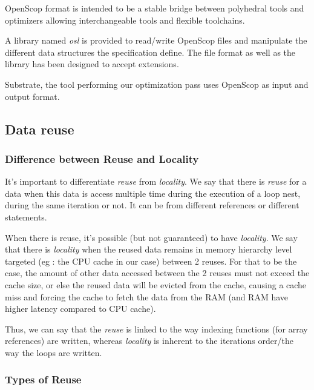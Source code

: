 \documentclass[paper=a4, fontsize=11pt]{scrartcl}
\numberwithin{equation}{section}        %
\numberwithin{figure}{section}          %
\numberwithin{table}{section}               %
\begin{document}
                OpenScop format is intended to be a stable bridge between polyhedral tools
                and optimizers allowing interchangeable tools and flexible toolchains.

                A library named \textit{osl} is provided to read/write OpenScop files
                and manipulate the different data structures the specification define.
                The file format as well as the library has been designed to accept extensions.

                Substrate, the tool performing our optimization pass uses OpenScop as input and output
                format.
    \subsection{Data reuse}
        \subsubsection{Difference between Reuse and Locality}
            It's important to differentiate \textit{reuse} from \textit{locality}.
            We say that there is \textit{reuse} for a data when this data is
            access multiple time during the execution of a loop nest, during
            the same iteration or not. It can be from different references or different statements.
            
            When there is reuse, it's possible (but not guaranteed) to have
            \textit{locality}. We say that there is \textit{locality} when the
            reused data remains in memory hierarchy level targeted 
            (eg : the CPU cache in our case) between 2 reuses.
            For that to be the case, the amount of other data accessed between the
            2 reuses must not exceed the cache size, or else the reused data will be
            evicted from the cache, causing a cache miss and forcing the cache
            to fetch the data from the RAM (and RAM have higher latency compared to CPU cache).


            Thus, we can say that the \textit{reuse} is linked to the way indexing
            functions (for array references) are written, whereas \textit{locality} is
            inherent to the iterations order/the way the loops are written.

        \subsubsection{Types of Reuse}
            
\end{document}
